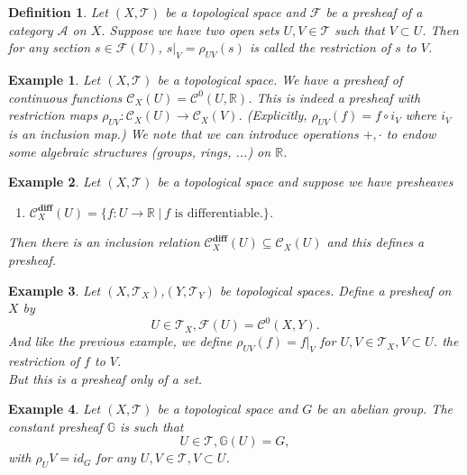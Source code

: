 \documentclass{article}
\newtheorem{definition}{Definition}[section]
\newtheorem{example}{Example}[section]
\numberwithin{equation}{section}
\begin{document}
\begin{definition}
Let $(X,\mathcal{T})$ be a topological space and $\mathcal{F}$ be a presheaf of a category $\mathcal{A}$ on $X$. Suppose we have two open sets $U,V\in\mathcal{T}$ such that $V\subset U$. Then for any section $s\in\mathcal{F}(U)$, $s|_V=\rho_{UV}(s)$ is called the restriction of $s$ to $V$.
\end{definition}

\begin{example}
Let $(X,\mathcal{T})$ be a topological space. We have a presheaf of continuous functions $\mathcal{C}_X(U)=\mathcal{C}^0(U,\mathbb{R})$. This is indeed a presheaf with restriction maps $\rho_{UV}:\mathcal{C}_X(U)\to\mathcal{C}_X(V)$. (Explicitly, $\rho_{UV}(f) = f\circ i_V$ where $i_V$ is an inclusion map.)  We note that we can introduce operations $+,\cdot$ to endow some algebraic structures (groups, rings, ...) on $\mathbb{R}$.
\end{example}

\begin{example}
Let $(X,\mathcal{T})$ be a topological space and suppose we have presheaves 
\begin{enumerate}[\textbullet]
\item $\mathcal{C}^{\textbf{diff}}_X(U) = \{f:U\to\mathbb{R}\:|\: f\text{ is differentiable.}\}$.
\end{enumerate}
Then there is an inclusion relation $\mathcal{C}^{\textbf{diff}}_X(U)\subseteq\mathcal{C}_X(U)$ and this defines a presheaf.
\end{example}

\begin{example}
Let $(X,\mathcal{T}_X)$,$(Y,\mathcal{T}_Y)$ be topological spaces. Define a presheaf on $X$ by 
\begin{equation*}
U\in\mathcal{T}_X, \mathcal{F}(U) = \mathcal{C}^0(X,Y).
\end{equation*}
And like the previous example, we define $\rho_{UV}(f) = f|_V$ for $U,V\in\mathcal{T}_X, V\subset U$. the restriction of $f$ to $V$. \\
But this is a presheaf only of a set. 
\end{example}

\begin{example}
Let $(X,\mathcal{T})$ be a topological space and $G$ be an abelian group. The constant presheaf $\mathbb{G}$ is such that 
\begin{equation*}
U\in\mathcal{T}, \mathbb{G}(U) = G,
\end{equation*}
with $\rho_UV=id_G$ for any $U,V\in\mathcal{T},V\subset U$. 
\end{example}
\end{document}
